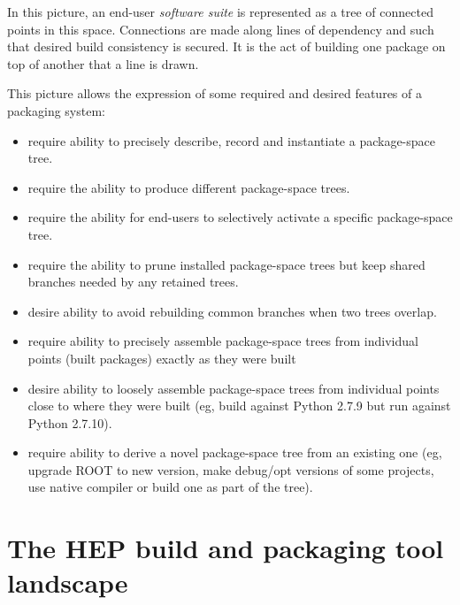 \documentclass[12pt,a4paper]{article}
\begin{document}
In this picture, an end-user \textit{software suite} is represented as a
tree of connected points in this space.  Connections are made along
lines of dependency and such that desired build consistency is secured.
It is the act of building one package on top of another that a line is
drawn.

This picture allows the expression of some required and desired features
of a packaging system:

\begin{itemize}

\item require ability to precisely describe, record and instantiate a
package-space tree.

\item require the ability to produce different package-space trees.

\item require the ability for end-users to selectively activate a
specific package-space tree.

\item require the ability to prune installed package-space trees but
keep shared branches needed by any retained trees.

\item desire ability to avoid rebuilding common branches when two trees
overlap.

\item require ability to precisely assemble package-space trees from
individual points (built packages) exactly as they were built

\item desire ability to loosely assemble package-space trees from
individual points close to where they were built (eg, build against
Python 2.7.9 but run against Python 2.7.10).

\item require ability to derive a novel package-space tree from an
existing one (eg, upgrade ROOT to new version, make debug/opt versions
of some projects, use native compiler or build one as part of the tree).

\end{itemize}

\section{The HEP build and packaging tool landscape}
\end{document}
